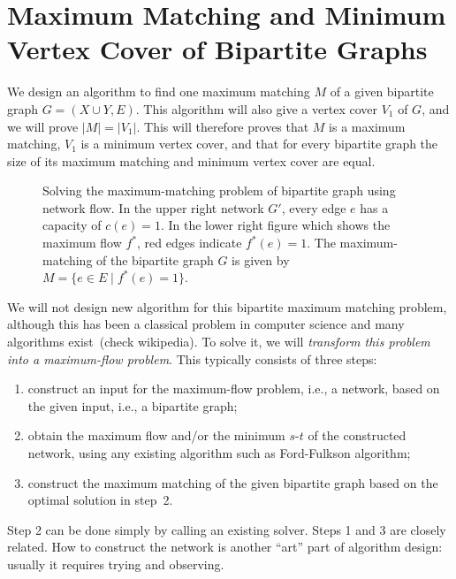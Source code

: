 \section*{Maximum Matching and Minimum Vertex Cover of Bipartite Graphs}

We design an algorithm to find one maximum matching $M$ of a given bipartite graph $G = (X\cup Y, E)$.
This algorithm will also give a vertex cover $V_1$ of $G$, and we will prove $|M| = |V_1|$.
This will therefore proves that $M$ is a maximum matching, $V_1$ is a minimum vertex cover, and that
for every bipartite graph the size of its maximum matching and minimum vertex cover are equal.

\begin{figure}[!b]
\centering{}
\caption{Solving the maximum-matching problem of bipartite graph using network flow.
In the upper right network $G'$, every edge $e$ has a capacity of $c(e) = 1$.
In the lower right figure which shows the maximum flow $f^*$, red edges indicate $f^*(e)=1$. 
The maximum-matching of the bipartite graph $G$ is given by $M = \{e\in E\mid f^*(e) = 1\}$.}
\label{fig:transform}
\end{figure}


We will not design new algorithm for this bipartite maximum matching problem, although this has
been a classical problem in computer science and many algorithms exist~(check wikipedia).
To solve it, we will \emph{transform this problem into a maximum-flow problem}.
This typically consists of three steps:
\vspace*{-\topsep}
\begin{enumerate}
\item construct an input for the maximum-flow problem, i.e., a network, based
on the given input, i.e., a bipartite graph;
\item obtain the maximum flow and/or the minimum $s$-$t$ of the constructed
network, using any existing algorithm such as Ford-Fulkson algorithm;
\item construct the maximum matching of the given bipartite graph based on the
optimal solution in step~2.
\end{enumerate}

Step 2 can be done simply by calling an existing solver. Steps 1 and 3 are closely related.
How to construct the network is another ``art'' part of algorithm design: usually it requires
trying and observing.


